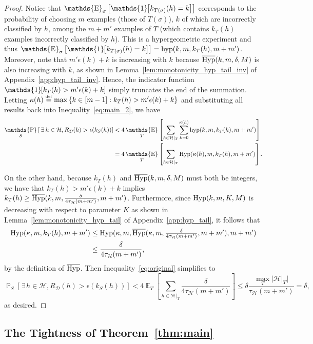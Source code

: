 \documentclass[twoside,11pt]{article}
\newcommand{\Id}[1]{\mathds{1}\hspace{-2.5pt}\left[#1\right]}
\let\oldexists=\exists
\renewcommand{\exists}{\hspace{1pt}\oldexists\hspace{1pt}}
\newcommand{\cb}[1]{\left\{#1\right\}}
\newcommand{\D}{\mathcal{D}}
\renewcommand{\H}{{\mathcal{H}}}
\newcommand{\eqdef}{\overset{\smash{\mbox{\tiny \rm def}}}{=}}
\DeclareMathOperator*{\Prob}{\mathds{P}}
\newcommand{\prob}[2]{\Prob_{#1}\left[#2\right]}
\DeclareMathOperator*{\Expectation}{\mathds{E}}
\newcommand{\exv}[2]{\Expectation_{#1}\left[#2\right]}
\newcommand{\hyp}{\textnormal{hyp}}
\newcommand{\Hyp}{\textnormal{Hyp}}
\newcommand{\HypInv}{\overline{\textnormal{Hyp}}}
\begin{document}
\begin{proof}
Notice that $\exv{\sigma}{\Id{k_{T(\sigma)}(h) = k} }$ corresponds to the probability of choosing $m$ examples (those of $T(\sigma)$), $k$ of which are incorrectly classified by $h$, among the $m + m'$ examples of $T$ (which contains $k_T(h)$ examples incorrectly classified by $h$).
This is a hypergeometric experiment and thus $\exv{\sigma}{\Id{k_{T(\sigma)}(h) = k}} = \hyp(k, m, k_T(h), m+m')$.
Moreover, note that $m'\epsilon(k) + k$ is increasing with $k$ because $\HypInv(k,m,\delta,M)$ is also increasing with $k$, as shown in Lemma~\ref{lem:monotonicity_hyp_tail_inv} of Appendix~\ref{app:hyp_tail_inv}.
Hence, the indicator function $\Id{ k_{T}(h) > m'\epsilon(k) + k}$ simply truncates the end of the summation.
Letting $\kappa(h) \eqdef \max\cb{k \in [m-1] : k_T(h) > m'\epsilon(k) + k}$ and substituting all results back into Inequality~\eqref{eq:main_2}, we have
\begin{align}
\nonumber\prob{S}{\exists h \in \H, R_\D(h) > \epsilon(k_S(h))}
    &< 4 \exv{T}{\sum_{h\in \H|_T} \sum_{k=0}^{\kappa(h)}\hyp(k, m, k_T(h), m+m') }\\
    &=4 \exv{T}{\sum_{h\in \H|_T} \Hyp(\kappa(h), m, k_T(h), m+m') }.\label{eq:original}
\end{align}

On the other hand, because $k_T(h)$ and $\HypInv(k,m,\delta,M)$ must both be integers, we have that $k_T(h) > m'\epsilon(k)+k$ implies $k_T(h) \ge \HypInv(k, m, \frac{\delta}{4\tau_\H(m+m')}, m+m')$.
Furthermore, since $\Hyp(k, m, K, M)$ is decreasing with respect to parameter $K$ as shown in Lemma~\ref{lem:monotonicity_hyp_tail} of Appendix~\ref{app:hyp_tail}, it follows that
\begin{align}
    \Hyp(\kappa, m, k_T(h), m+m') &\le \Hyp(\kappa, m, \HypInv(\kappa, m, \textstyle\frac{\delta}{4\tau_\H(m+m')}, m+m'), m+m')\label{eq:main_4}\\
    &\le \frac{\delta}{4\tau_\H(m+m')},\nonumber
\end{align}
by the definition of $\HypInv$.
Then Inequality~\eqref{eq:original} simplifies to
\begin{equation}\label{eq:main_5}
\prob{S}{\exists h \in \H, R_\D(h) > \epsilon(k_S(h))}
    <4 \exv{T}{\sum_{h \in\H|_T} \frac{\delta}{4\tau_\H(m+m')} }
    \le \delta \frac{\max_{T} \bigl| \H|_T \bigr| }{\tau_\H(m+m')}  =\delta,
\end{equation}
as desired.
\end{proof}

\subsection{The Tightness of Theorem~\ref{thm:main}}
\label{ssec:tightness_thm_main}
\end{document}
